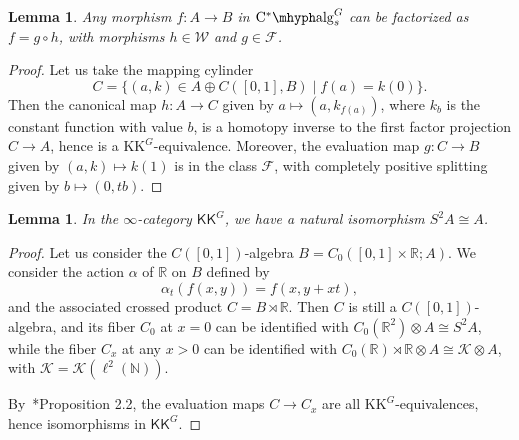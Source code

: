 \documentclass[a4paper,reqno]{amsart}
\theoremstyle{plain}
\newtheorem{lemma}[theorem]{Lemma}
\theoremstyle{definition}
\theoremstyle{remark}
\numberwithin{equation}{section}
\newcommand{\cF}{\mathcal{F}}
\newcommand{\cK}{\mathcal{K}}
\newcommand{\cW}{\mathcal{W}}
\newcommand{\dN}{\mathbb{N}}
\newcommand{\dR}{\mathbb{R}}
\newcommand{\CstAlg}{\mathrm{C}^*\mhyph\mathrm{alg}}
\newcommand{\KK}{\mathrm{KK}}
\newcommand{\icKK}{\mathsf{KK}}
\begin{document}
\begin{lemma}\label{lem:cat-fib-obj-extra-factoriz-prop}
Any morphism $f \colon A \to B$ in $\CstAlg_s^G$ can be factorized as $f = g \circ h$, with morphisms $h \in \cW$ and $g \in \cF$.
\end{lemma}

\begin{proof}
Let us take the mapping cylinder
\[
C = \{ (a, k) \in A \oplus C([0, 1], B) \mid f(a) = k(0) \}.
\]
Then the canonical map $h \colon A \to C$ given by $a \mapsto (a, k_{f(a)})$, where $k_b$ is the constant function with value $b$, is a homotopy inverse to the first factor projection $C \to A$, hence is a $\KK^G$-equivalence.
Moreover, the evaluation map $g \colon C \to B$ given by $(a, k) \mapsto k(1)$ is in the class $\cF$, with completely positive splitting given by $b \mapsto (0, t b)$.
\end{proof}

\begin{lemma}\label{lem:bott-periodicity}
In the $\infty$-category $\icKK^G$, we have a natural isomorphism $S^2 A \cong A$.
\end{lemma}

\begin{proof}
Let us consider the $C([0, 1])$-algebra $B = C_0([0, 1] \times \dR; A)$.
We consider the action $\alpha$ of $\dR$ on $B$ defined by
\[
\alpha_t(f(x, y)) = f(x, y + x t),
\]
and the associated crossed product $C = B \rtimes \dR$.
Then $C$ is still a $C([0, 1])$-algebra, and its fiber $C_0$ at $x = 0$ can be identified with $C_0(\dR^2) \otimes A \cong S^2 A$, while the fiber $C_x$ at any $x > 0$ can be identified with $C_0(\dR) \rtimes \dR \otimes A \cong \cK \otimes A$, with $\cK = \cK(\ell^2(\dN))$.

By~\cite{MR2511635}*{Proposition 2.2}, the evaluation maps $C \to C_x$ are all $\KK^G$-equivalences, hence isomorphisms in $\icKK^G$.
\end{proof}
\end{document}
